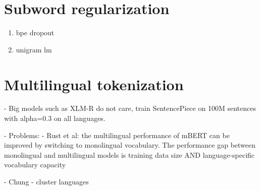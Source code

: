










\section{Subword regularization}

\begin{enumerate}
    \item bpe dropout
    \item unigram lm
\end{enumerate}

\section{Multilingual tokenization}

- Big models such as XLM-R do not care, train SentencePiece on 100M sentences with alpha=0.3 on all languages.

- Problems:
- Rust et al: the multilingual performance of mBERT can be improved by switching to monolingual vocabulary. The performance gap between monolingual and multilingual models is training data size AND language-specific vocabulary capacity



- Chung - cluster languages

